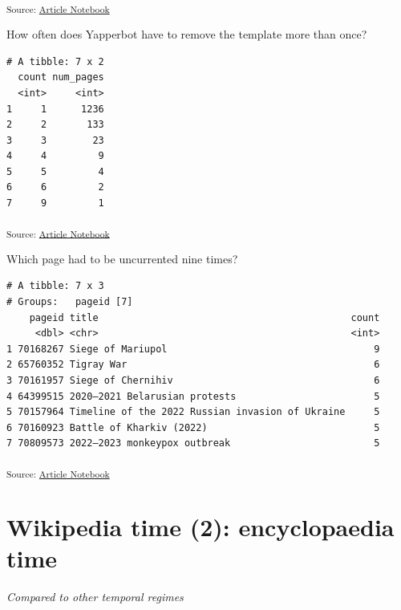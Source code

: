 \documentclass[
  Crown,
  times,
  sageh]{sagej}
\begin{document}
\textsubscript{Source:
\href{https://wikihistories.github.io/the-bot-that-makes-history/the-bot-that-makes-history.qmd.html}{Article
Notebook}}

How often does Yapperbot have to remove the template more than once?

\begin{verbatim}
# A tibble: 7 x 2
  count num_pages
  <int>     <int>
1     1      1236
2     2       133
3     3        23
4     4         9
5     5         4
6     6         2
7     9         1
\end{verbatim}

\textsubscript{Source:
\href{https://wikihistories.github.io/the-bot-that-makes-history/the-bot-that-makes-history.qmd.html}{Article
Notebook}}

Which page had to be uncurrented nine times?

\begin{verbatim}
# A tibble: 7 x 3
# Groups:   pageid [7]
    pageid title                                            count
     <dbl> <chr>                                            <int>
1 70168267 Siege of Mariupol                                    9
2 65760352 Tigray War                                           6
3 70161957 Siege of Chernihiv                                   6
4 64399515 2020–2021 Belarusian protests                        5
5 70157964 Timeline of the 2022 Russian invasion of Ukraine     5
6 70160923 Battle of Kharkiv (2022)                             5
7 70809573 2022–2023 monkeypox outbreak                         5
\end{verbatim}

\textsubscript{Source:
\href{https://wikihistories.github.io/the-bot-that-makes-history/the-bot-that-makes-history.qmd.html}{Article
Notebook}}

\section{Wikipedia time (2): encyclopaedia
time}\label{wikipedia-time-2-encyclopaedia-time}

\emph{Compared to other temporal regimes}


\end{document}
